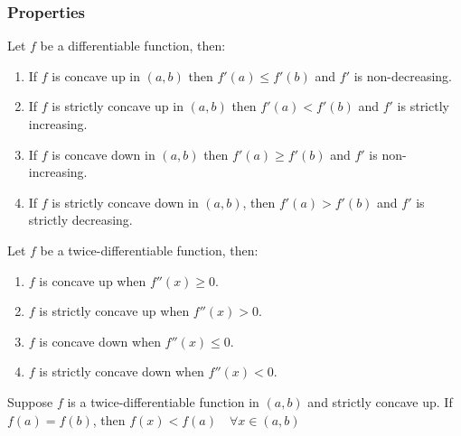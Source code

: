 \documentclass[14]{article}
\theoremstyle{definition}
\theoremstyle{case}
\begin{document}
\subsubsection{Properties}
Let $f$ be a differentiable function, then:
\begin{enumerate}
\item If $f$ is concave up in $(a, b)$ then $f'(a) \leq f'(b)$ and $f'$ is non-decreasing.
\item If $f$ is strictly concave up in $(a, b)$ then $f'(a) < f'(b)$ and $f'$ is strictly increasing.
\item If $f$ is concave down in $(a, b)$ then $f'(a) \geq f'(b)$ and $f'$ is non-increasing.
\item If $f$ is strictly concave down in $(a, b)$, then $f'(a) > f'(b)$ and $f'$ is strictly decreasing.
\end{enumerate}
Let $f$ be a twice-differentiable function, then:
\begin{enumerate}
\item $f$ is concave up when $f''(x) \geq 0$.
\item $f$ is strictly concave up when $f''(x) > 0$.
\item $f$ is concave down when $f''(x) \leq 0$.
\item $f$ is strictly concave down when $f''(x) < 0$.
\end{enumerate}
Suppose $f$ is a twice-differentiable function in $(a, b)$ and strictly concave up. If $f(a) = f(b)$, then $f(x) < f(a) \quad \forall x \in (a, b)$
\end{document}
